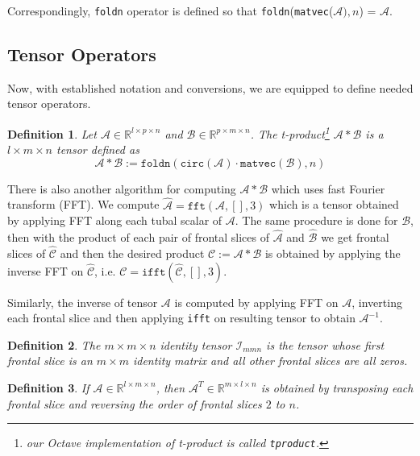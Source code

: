 \documentclass[twoside]{article}
\newtheorem{defn}{Definition}
\newcommand{\code}[1]{\texttt{#1}}
\begin{document}
\begin{multicols}{2}
\noindent Correspondingly, \code{foldn} operator is defined so that \code{foldn}(\code{matvec}($\mathcal{A}),n$) = $\mathcal{A}$.

\subsection{Tensor Operators}
Now, with established notation and conversions, we are equipped to define needed tensor operators.

\begin{defn} Let $\mathcal{A} \in \mathbb{R}^{l \times p \times n}$ and $\mathcal{B} \in \mathbb{R}^{p \times m \times n}$. The t-product\footnote{our Octave implementation of t-product is called \code{tproduct}.} $\mathcal{A} \ast \mathcal{B}$ is a $l \times m \times n$ tensor defined as
\[ \mathcal{A} \ast \mathcal{B} := \code{foldn}(\code{circ}(\mathcal{A}) \cdot \code{matvec}(\mathcal{B}) ,n) \]
\end{defn}

There is also another algorithm for computing $\mathcal{A} \ast \mathcal{B}$ which uses fast Fourier transform (FFT). We compute $\hat{\mathcal{A}} = \code{fft}(\mathcal{A},[],3)$ which is a tensor obtained by applying FFT along each tubal scalar of $\mathcal{A}$. The same procedure is done for $\mathcal{B}$, then with the product of each pair of frontal slices of $\hat{\mathcal{A}}$ and $\hat{\mathcal{B}}$ we get frontal slices of $\hat{\mathcal{C}}$ and then the desired product $\mathcal{C} := \mathcal{A} \ast \mathcal{B}$ is obtained by applying the inverse FFT on $\hat{\mathcal{C}}$, i.e. $\mathcal{C} = \code{ifft}(\hat{\mathcal{C}},[],3)$.

Similarly, the inverse of tensor $\mathcal{A}$ is computed by applying FFT on $\mathcal{A}$, inverting each frontal slice and then applying \code{ifft} on resulting tensor to obtain $\mathcal{A}^{-1}$.

\begin{defn} The $m \times m \times n$ identity tensor $\mathcal{I}_{mmn}$ is the tensor whose first frontal slice is an $m \times m$ identity matrix and all other frontal slices are all zeros. 
\end{defn}

\begin{defn} If $\mathcal{A} \in \mathbb{R}^{l \times m \times n}$, then $\mathcal{A}^T \in \mathbb{R}^{m \times l \times n}$ is obtained by transposing each frontal slice and reversing the order of frontal slices $2$ to $n$.
\end{defn}


\end{multicols}
\end{document}
